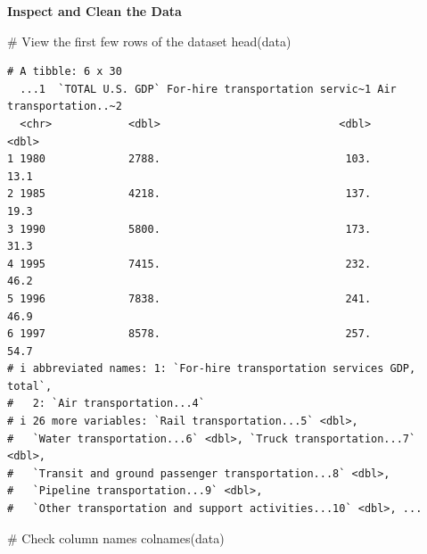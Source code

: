 \documentclass[
  letterpaper,
  DIV=11,
  numbers=noendperiod]{scrreprt}
\newenvironment{Shaded}{\begin{snugshade}}{\end{snugshade}}
\newcommand{\CommentTok}[1]{\textcolor[rgb]{0.37,0.37,0.37}{#1}}
\newcommand{\FunctionTok}[1]{\textcolor[rgb]{0.28,0.35,0.67}{#1}}
\newcommand{\NormalTok}[1]{\textcolor[rgb]{0.00,0.23,0.31}{#1}}
\begin{document}
\textbf{Inspect and Clean the Data}

\begin{Shaded}
\begin{Highlighting}[]
\CommentTok{\# View the first few rows of the dataset}
\FunctionTok{head}\NormalTok{(data)}
\end{Highlighting}
\end{Shaded}

\begin{verbatim}
# A tibble: 6 x 30
  ...1  `TOTAL U.S. GDP` For-hire transportation servic~1 Air transportation..~2
  <chr>            <dbl>                            <dbl>                  <dbl>
1 1980             2788.                             103.                   13.1
2 1985             4218.                             137.                   19.3
3 1990             5800.                             173.                   31.3
4 1995             7415.                             232.                   46.2
5 1996             7838.                             241.                   46.9
6 1997             8578.                             257.                   54.7
# i abbreviated names: 1: `For-hire transportation services GDP, total`,
#   2: `Air transportation...4`
# i 26 more variables: `Rail transportation...5` <dbl>,
#   `Water transportation...6` <dbl>, `Truck transportation...7` <dbl>,
#   `Transit and ground passenger transportation...8` <dbl>,
#   `Pipeline transportation...9` <dbl>,
#   `Other transportation and support activities...10` <dbl>, ...
\end{verbatim}

\begin{Shaded}
\begin{Highlighting}[]
\CommentTok{\# Check column names}
\FunctionTok{colnames}\NormalTok{(data)}
\end{Highlighting}
\end{Shaded}
\end{document}
